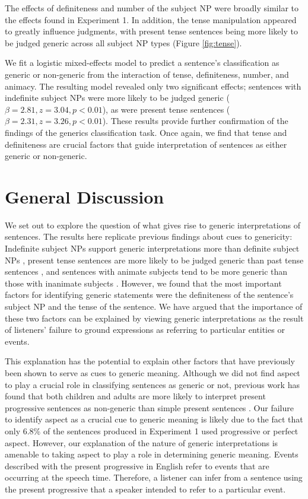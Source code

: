 \documentclass[10pt,letterpaper]{article}
\begin{document}
The effects of definiteness and number of the subject NP were broadly similar to the effects found in Experiment 1. In addition, the tense manipulation appeared to greatly influence judgments, with present tense sentences being more likely to be judged generic across all subject NP types (Figure \ref{fig:tense}).

We fit a logistic mixed-effects model to predict a sentence's classification as generic or non-generic from the interaction of tense, definiteness, number, and animacy. The resulting model revealed only two significant effects; sentences with indefinite subject NPs were more likely to be judged generic (\(\beta = 2.81, z = 3.04, p < 0.01\)), as were present tense sentences (\(\beta = 2.31, z = 3.26, p < 0.01\)). These results provide further confirmation of the findings of the generics classification task. Once again, we find that tense and definiteness are crucial factors that guide interpretation of sentences as either generic or non-generic.

\section{General Discussion}

We set out to explore the question of what gives rise to generic interpretations of sentences. The results here replicate previous findings about cues to genericity: Indefinite subject NPs support generic interpretations more than definite subject NPs \cite{Cimpian:2011, Gelman:2003}, present tense sentences are more likely to be judged generic than past tense sentences \cite{Cimpian:2011}, and sentences with animate subjects tend to be more generic than those with inanimate subjects \cite{Brandone:2009}. However, we found that the most important factors for identifying generic statements were the definiteness of the sentence's subject NP and the tense of the sentence. We have argued that the importance of these two factors can be explained by viewing generic interpretations as the result of listeners' failure to ground expressions as referring to particular entities or events.

This explanation has the potential to explain other factors that have previously been shown to serve as cues to generic meaning. Although we did not find aspect to play a crucial role in classifying sentences as generic or not, previous work has found that both children and adults are more likely to interpret present progressive sentences as non-generic than simple present sentences \cite{Cimpian:2011}. Our failure to identify aspect as a crucial cue to generic meaning is likely due to the fact that only 6.8\% of the sentences produced in Experiment 1 used progressive or perfect aspect. However, our explanation of the nature of generic interpretations is amenable to taking aspect to play a role in determining generic meaning. Events described with the present progressive in English refer to events that are occurring at the speech time. Therefore, a listener can infer from a sentence using the present progressive that a speaker intended to refer to a particular event.
\end{document}

